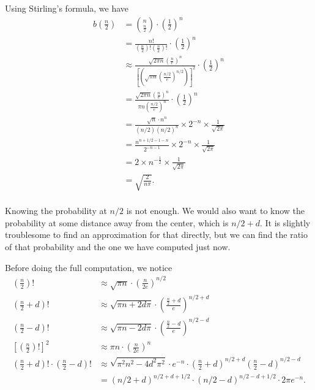 \documentclass[11pt, a4paper, oneside]{book}
\theoremstyle{definition}
\begin{document}
\noindent Using Stirling's formula, we have
\begin{equation*}
\begin{split}
b(\frac{n}{2}) &= {n \choose \frac{n}{2}}\cdot (\frac{1}{2})^n \\
&= \frac{n!}{(\frac{n}{2})!(\frac{n}{2})!} \cdot (\frac{1}{2})^n \\
&\approx \frac{\sqrt{2\pi n}(\frac{n}{e})^n}{[(\sqrt{\pi n}(\frac{n/2}{e})^{n/2})]^2} \cdot (\frac{1}{2})^n \\
&= \frac{\sqrt{2\pi n}(\frac{n}{e})^n}{{\pi n}(\frac{n/2}{e})^{n}} \cdot (\frac{1}{2})^n \\
&= \frac{\sqrt{n}\cdot n^n}{(n/2) (n/2)^n} \times 2^{-n} \times \frac{1}{\sqrt{2\pi}} \\
&= \frac{n^{n+1/2 -1 -n}}{2^{-n-1}} \times 2^{-n} \times \frac{1}{\sqrt{2\pi}} \\
&= 2 \times n^{-\frac{1}{2}} \times \frac{1}{\sqrt{2\pi}} \\
&= \sqrt{\frac{2}{n\pi}}. \\
\end{split}
\end{equation*}

\noindent Knowing the probability at $n/2$ is not enough. We would also want to know the probability at some distance away from the center, which is $n/2 + d$. It is slightly troublesome to find an approximation for that directly, but we can find the ratio of that probability and the one we have computed just now. 

\noindent Before doing the full computation, we notice
\begin{equation*}
\begin{split}
(\frac{n}{2})! &\approx  \sqrt{\pi n}\cdot (\frac{n}{2e})^{n/2} \\
(\frac{n}{2} + d)! &\approx  \sqrt{\pi n + 2d \pi}\cdot (\frac{\frac{n}{2}+d}{e})^{n/2+d} \\
(\frac{n}{2} - d)! &\approx  \sqrt{\pi n - 2d \pi}\cdot (\frac{\frac{n}{2}-d}{e})^{n/2-d} \\
[(\frac{n}{2})!]^2 &\approx  \pi n \cdot (\frac{n}{2e})^{n} \\
(\frac{n}{2} + d)!\cdot (\frac{n}{2} - d)! &\approx  \sqrt{\pi^2 n^2 - 4d^2 \pi^2}\cdot e^{-n} \cdot ({\frac{n}{2}+d})^{n/2+d} ({\frac{n}{2}-d})^{n/2-d} \\
&=  (n/2+d)^{n/2+d+1/2} \cdot (n/2-d)^{n/2-d+1/2} \cdot 2\pi e^{-n}. \\
\end{split}
\end{equation*}
\end{document}

